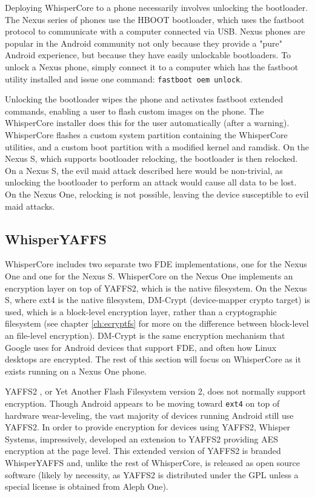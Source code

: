 Deploying WhisperCore to a phone necessarily involves unlocking the bootloader.  The Nexus series of phones use the HBOOT
bootloader, which uses the fastboot protocol to communicate with a computer connected via USB.  Nexus phones are popular in the
Android community not only because they provide a "pure" Android experience, but because they have easily unlockable bootloaders.
To unlock a Nexus phone, simply connect it to a computer which has the fastboot utility installed and issue one command:
\texttt{fastboot oem unlock}.

Unlocking the bootloader wipes the phone and activates fastboot extended commands, enabling a user to flash custom images on the
phone.  The WhisperCore installer does this for the user automatically (after a warning).  WhisperCore flashes a custom system
partition containing the WhisperCore utilities, and a custom boot partition with a modified kernel and ramdisk.  On the Nexus S,
which supports bootloader relocking, the bootloader is then relocked.  On a Nexus S, the evil maid attack described here would be
non-trivial, as unlocking the bootloader to perform an attack would cause all data to be lost.  On the Nexus One, relocking is not
possible, leaving the device susceptible to evil maid attacks. 

\subsection{WhisperYAFFS}
WhisperCore includes two separate two FDE implementations, one for the Nexus One and one for the Nexus S. WhisperCore on the Nexus
One implements an encryption layer on top of YAFFS2, which is the native filesystem.  On the Nexus S, where ext4 is the native
filesystem, DM-Crypt (device-mapper crypto target) is used, which is a block-level encryption layer, rather than a cryptographic
filesystem (see chapter \ref{ch:ecryptfs} for more on the difference between block-level an file-level encryption).  DM-Crypt is the
same encryption mechanism that Google uses for Android devices that support FDE, and often how Linux desktops are encrypted.  The
rest of this section will focus on WhisperCore as it exists running on a Nexus One phone.

YAFFS2 \cite{howyaffsworks}, or Yet Another Flash Filesystem version 2, does not normally support encryption.  Though Android
appears to be moving toward \texttt{ext4} on top of hardware wear-leveling, the vast majority of devices running Android still use
YAFFS2.  In order to provide encryption for devices using YAFFS2, Whisper Systems, impressively, developed an extension to YAFFS2
providing AES encryption at the page level.  This extended version of YAFFS2 is branded WhisperYAFFS and, unlike the rest of
WhisperCore, is released as open source software (likely by necessity, as YAFFS2 is distributed under the GPL unless a special
license is obtained from Aleph One).

